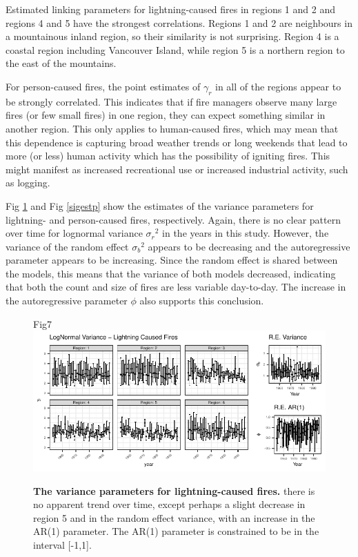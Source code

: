 \documentclass[10pt,letterpaper]{article}
\begin{document}
Estimated linking parameters for lightning-caused fires in regions 1 and
2 and regions 4 and 5 have the strongest correlations. Regions 1 and 2
are neighbours in a mountainous inland region, so their similarity is
not surprising. Region 4 is a coastal region including Vancouver Island,
while region 5 is a northern region to the east of the mountains.

For person-caused fires, the point estimates of \(\gamma_r\) in all of
the regions appear to be strongly correlated. This indicates that if
fire managers observe many large fires (or few small fires) in one
region, they can expect something similar in another region. This only
applies to human-caused fires, which may mean that this dependence is
capturing broad weather trends or long weekends that lead to more (or less) human
activity which has the possibility of igniting fires. This might manifest
as increased recreational use or increased industrial activity, such as logging.

Fig \ref{sigestl} and Fig \ref{sigestp} show the estimates of the
variance parameters for lightning- and person-caused fires,
respectively. Again, there is no clear pattern over time for lognormal
variance ${\sigma_r}^2$ in the years in this study. However, the variance of the random
effect ${\sigma_b}^2$ appears to be decreasing and the autoregressive parameter appears
to be increasing. Since the random effect is shared between the models,
this means that the variance of both models decreased, indicating that
both the count and size of fires are less variable day-to-day. The
increase in the autoregressive parameter $\phi$ also supports this conclusion.

\begin{figure}[h!]
\centering
Fig7
\includegraphics[width=\textwidth]{Joint_Count_Files/sigestl-1.pdf}
\caption{\label{sigestl}\textbf{The variance parameters for lightning-caused
fires.} there is no apparent trend over time, except perhaps a slight
decrease in region 5 and in the random effect variance, with an increase
in the AR(1) parameter. The AR(1) parameter is constrained to be in the
interval {[}-1,1{]}.}
\end{figure}
\end{document}
